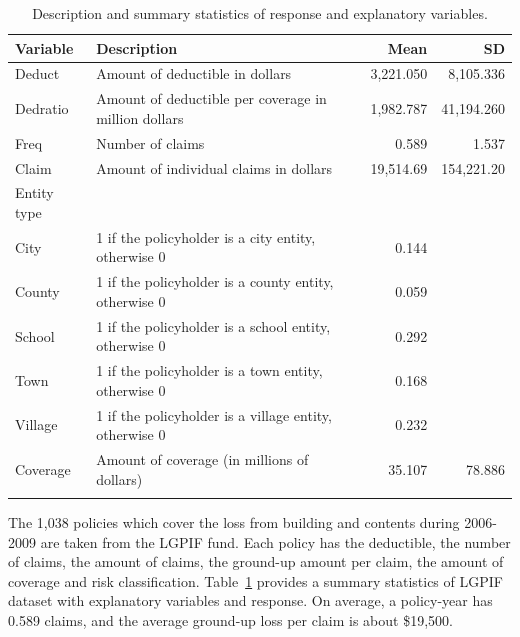 \documentclass[11pt]{article}
\newcommand{\rev}[1]{{\color{blue}#1}}
\begin{document}
\begin{table}[ht!]
\centering
\begin{tabular}[t]{llrr}
\toprule
  Variable & Description & Mean & SD\\
\midrule
Deduct & Amount of deductible in dollars & 3,221.050 & 8,105.336\\
Dedratio & Amount of deductible per coverage in million dollars& 1,982.787 & 41,194.260\\
Freq & Number of claims & 0.589& 1.537\\
Claim & Amount of individual claims in dollars & 19,514.69 & 154,221.20\\
Entity type & & &\\
\quad City & 1 if the policyholder is a city entity, otherwise 0 &0.144 & \\
\quad County & 1 if the policyholder is a county entity, otherwise 0  & 0.059& \\
\quad School & 1 if the policyholder is a school entity, otherwise 0 & 0.292 & \\
\quad Town & 1 if the policyholder is a town entity, otherwise 0 & 0.168 &  \\
\quad Village & 1 if the policyholder is a village entity, otherwise 0 & 0.232 & \\
Coverage & Amount of coverage (in millions of dollars) & 35.107 & 78.886\\
\hhline{====}
\end{tabular}
\caption{Description and summary statistics of response and explanatory variables.}
\label{tab:lgpif summary}
\end{table}

The 1,038 policies which cover the loss from building and contents during 2006-2009 are taken from the LGPIF fund. Each policy has the deductible, the number of claims, the amount of claims, the ground-up amount per claim, the amount of coverage and risk classification. Table~\ref{tab:lgpif summary} provides a summary statistics of LGPIF dataset with explanatory variables and response. \rev{On average, a policy-year has 0.589 claims, and the average ground-up loss per claim is about \$19,500.}\\
\end{document}
